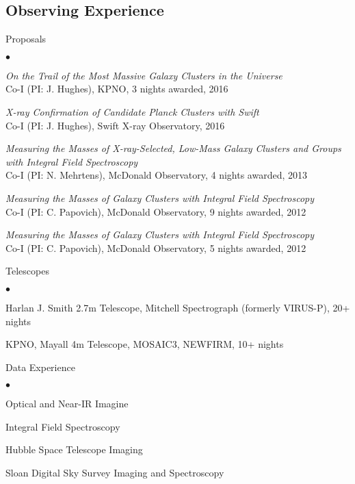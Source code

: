 \documentclass[margin,line, 11pt]{res}
\newenvironment{list2}{
  \begin{list}{$\bullet$}{%
      \setlength{\itemsep}{0in}
      \setlength{\parsep}{0in} \setlength{\parskip}{0in}
      \setlength{\topsep}{0in} \setlength{\partopsep}{0in}
      \setlength{\leftmargin}{0.2in}}}{\end{list}}
\begin{document}
\begin{resume}
\section{Observing Experience}
Proposals
    \begin{list2}
        \vspace*{.05in}
    \item \emph{On the Trail of the Most Massive Galaxy Clusters in the Universe}\\
    Co-I (PI: J. Hughes), KPNO, 3 nights awarded, 2016
    \item \emph{X-ray Confirmation of Candidate Planck Clusters with Swift}\\
    Co-I (PI: J. Hughes), Swift X-ray Observatory, 2016
    \item \emph{Measuring the Masses of X-ray-Selected, Low-Mass Galaxy Clusters and Groups with Integral Field Spectroscopy}\\
		Co-I (PI: N. Mehrtens), McDonald Observatory, 4 nights awarded, 2013
    \item \emph{Measuring the Masses of Galaxy Clusters with Integral Field Spectroscopy}\\
		Co-I (PI: C. Papovich), McDonald Observatory, 9 nights awarded, 2012
    \item \emph{Measuring the Masses of Galaxy Clusters with Integral Field Spectroscopy}\\
		Co-I (PI: C. Papovich), McDonald Observatory, 5 nights awarded, 2012
	\end{list2}
Telescopes
    \begin{list2}
        \vspace*{.05in}
    \item Harlan J. Smith 2.7m Telescope, Mitchell Spectrograph (formerly VIRUS-P), 20+ nights
    \item KPNO, Mayall 4m Telescope, MOSAIC3, NEWFIRM, 10+ nights
	\end{list2}
Data Experience
    \begin{list2}
        \vspace*{.05in}
    \item Optical and Near-IR Imagine
		\item Integral Field Spectroscopy
    \item Hubble Space Telescope Imaging
		\item Sloan Digital Sky Survey Imaging and Spectroscopy
	\end{list2}


\end{resume}
\end{document}
